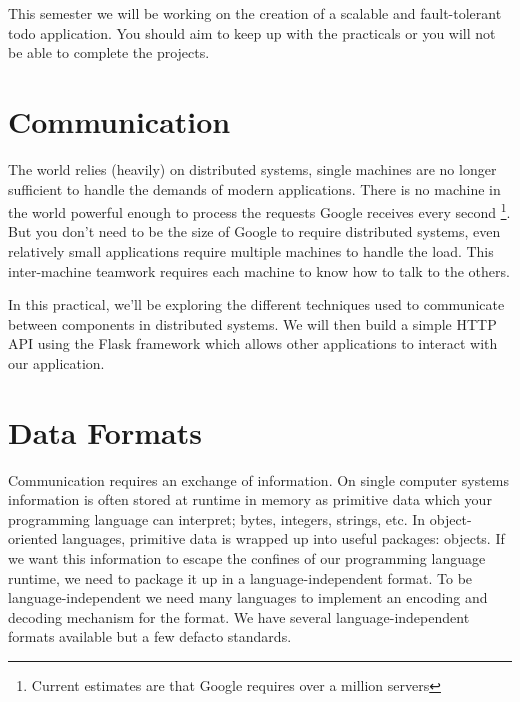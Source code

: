 \documentclass{csse4400}
\begin{document}
This semester we will be working on the creation of a scalable and fault-tolerant todo application.
You should aim to keep up with the practicals or you will not be able to complete the projects.


\section{Communication}
The world relies (heavily) on distributed systems,
single machines are no longer sufficient to handle the demands of modern applications.
There is no machine in the world powerful enough to process the requests Google receives every second%
\footnote{Current estimates are that Google requires over a million servers}.
But you don't need to be the size of Google to require distributed systems,
even relatively small applications require multiple machines to handle the load.
This inter-machine teamwork requires each machine to know how to talk to the others.

In this practical,
we'll be exploring the different techniques used to communicate between components in distributed systems.
We will then build a simple HTTP API using the Flask framework which allows other applications to interact with our application.

\section{Data Formats}
Communication requires an exchange of information.
On single computer systems information is often stored at runtime in memory as primitive data which your programming language can interpret;
bytes, integers, strings, etc.
In object-oriented languages,
primitive data is wrapped up into useful packages: objects.
If we want this information to escape the confines of our programming language runtime,
we need to package it up in a language-independent format.
To be language-independent we need many languages to implement an encoding and decoding mechanism for the format.
We have several language-independent formats available but a few defacto standards.
\end{document}
